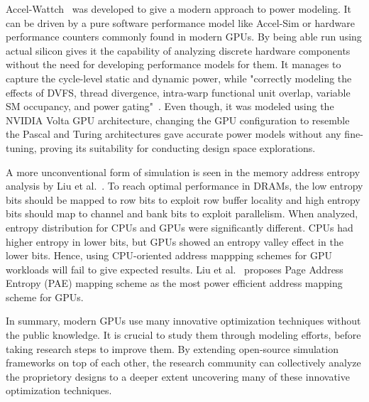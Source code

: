 Accel-Wattch~\cite{Kandiah2021} was developed to give a modern approach to power modeling.
It can be driven by a pure software performance model like Accel-Sim or hardware performance counters commonly found in modern GPUs.
By being able run using actual silicon gives it the capability of analyzing discrete hardware components without the need for developing performance models for them.
It manages to capture the cycle-level static and dynamic power, while "correctly modeling the effects of DVFS, thread divergence, intra-warp functional unit overlap, variable SM occupancy, and power gating"~\cite{Kandiah2021}.
Even though, it was modeled using the NVIDIA Volta GPU architecture, changing the GPU configuration to resemble the Pascal and Turing architectures gave accurate power models without any fine-tuning, proving its suitability for conducting design space explorations.

A more unconventional form of simulation is seen in the memory address entropy analysis by Liu et al.~\cite{Liu2018}.
To reach optimal performance in DRAMs, the low entropy bits should be mapped to row bits to exploit row buffer locality and high entropy bits should map to channel and bank bits to exploit parallelism.
When analyzed, entropy distribution for CPUs and GPUs were significantly different.
CPUs had higher entropy in lower bits, but GPUs showed an entropy valley effect in the lower bits.
Hence, using CPU-oriented address mappping schemes for GPU workloads will fail to give expected results.
Liu et al.~\cite{Liu2018} proposes Page Address Entropy (PAE) mapping scheme as the most power efficient address mapping scheme for GPUs.

In summary, modern GPUs use many innovative optimization techniques without the public knowledge.
It is crucial to study them through modeling efforts, before taking research steps to improve them.
By extending open-source simulation frameworks on top of each other, the research community can collectively analyze the proprietory designs to a deeper extent uncovering many of these innovative optimization techniques.
